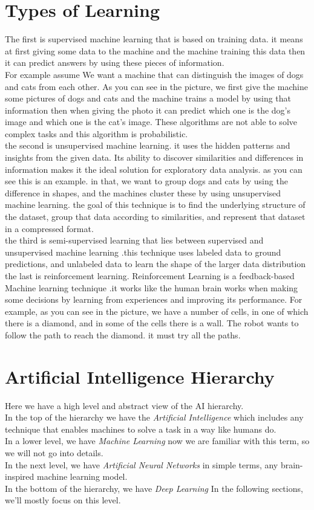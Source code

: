 \documentclass{SBCbookchapter}
\begin{document}
\section*{Types of Learning}
The first is supervised machine learning that is based on training data. it means at first giving some data to the machine and the machine training this data then it can predict answers by using these pieces of information.\\
For example assume We want a machine that can distinguish the images of dogs and cats from each other. As you can see in the picture, we first give the machine some pictures of dogs and cats and the machine trains a model by using that information then when giving the photo it can predict which one is the dog's image and which one is the cat's image. These algorithms are not able to solve complex tasks and this algorithm is probabilistic.
\\ the second is unsupervised machine learning. it uses the hidden patterns and insights from the given data. Its ability to discover similarities and differences in information makes it the ideal solution for exploratory data analysis. as you can see this is an example. in that, we want to group dogs and cats by using the difference in shapes, and the machines cluster these by using unsupervised machine learning.
the goal of this technique is to find the underlying structure of the dataset, group that data according to similarities, and represent that dataset in a compressed format.
\\ the third is semi-supervised learning that lies between supervised and unsupervised machine learning .this technique uses labeled data to ground predictions, and unlabeled data to learn the shape of the larger data distribution
\\ the last is reinforcement learning. Reinforcement Learning is a feedback-based Machine learning technique .it works like the human brain works when making some decisions by learning from experiences and improving its performance. For example, as you can see in the picture, we have a number of cells, in one of which there is a diamond, and in some of the cells there is a wall. The robot wants to follow the path to reach the diamond. it must try all the paths.
\section*{Artificial Intelligence Hierarchy}
Here we have a high level and abstract view of the AI hierarchy.\\
In the top of the hierarchy we have the \textit{Artificial Intelligence}
which includes any technique that enables machines to solve a task in a
way like humans do.\\
In a lower level, we have \textit{Machine Learning}
now we are familiar with this term, so we will not go into details.\\
In the next level, we have \textit{Artificial Neural Networks}
in simple terms, any brain-inspired machine learning model. \\
In the bottom of the hierarchy, we have \textit{Deep Learning}
In the following sections, we'll mostly focus on this level.
\end{document}
